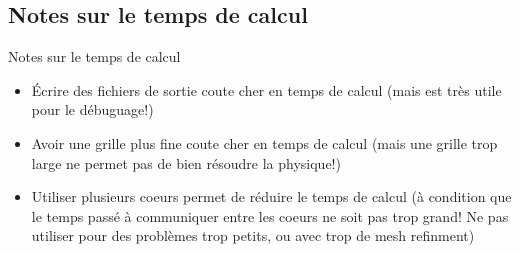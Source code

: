 \documentclass[9pt]{beamer}
\begin{document}

\subsection{Notes sur le temps de calcul}

\begin{frame}{Notes sur le temps de calcul}
    \begin{itemize}
        \item Écrire des fichiers de sortie coute cher en temps de calcul (mais est très utile pour le débuguage!)
        \item Avoir une grille plus fine coute cher en temps de calcul (mais une grille trop large ne permet pas de bien résoudre la physique!)
        \item Utiliser plusieurs coeurs permet de réduire le temps de calcul (à condition que le temps passé à communiquer entre les coeurs ne soit pas trop grand! Ne pas utiliser pour des problèmes trop petits, ou avec trop de mesh refinment)
        
    \end{itemize}
    

\end{frame}
\end{document}
